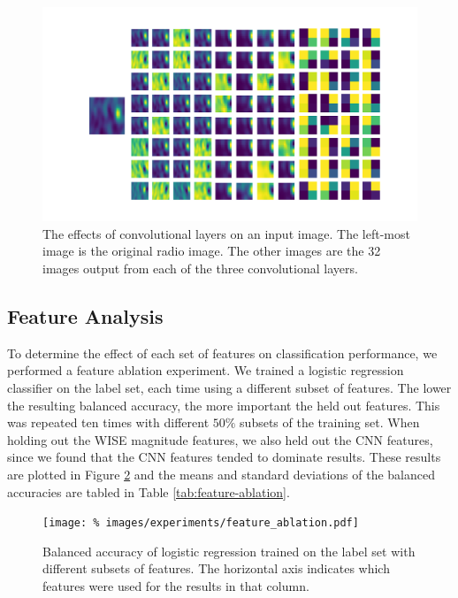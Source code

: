       \begin{figure}[!ht]
        \centering
        \includegraphics[width=\textwidth]{images/rgz_cnn}
        \caption{The effects of convolutional layers on an input image. The
          left-most image is the original radio image. The other images are the
          32 images output from each of the three convolutional layers.}
        \label{fig:rgz-cnn}
      \end{figure}

  \subsection{Feature Analysis}
  \label{sec:feature-analysis}

    To determine the effect of each set of features on classification
    performance, we performed a feature ablation experiment. We trained a
    logistic regression classifier on the \citeauthor{norris06} label set, each
    time using a different subset of features. The lower the resulting balanced
    accuracy, the more important the held out features. This was repeated ten
    times with different $50\%$ subsets of the training set. When holding out
    the WISE magnitude features, we also held out the CNN features, since we
    found that the CNN features tended to dominate results. These results are
    plotted in Figure \ref{fig:feature-ablation} and the means and standard
    deviations of the balanced accuracies are tabled in Table
    \ref{tab:feature-ablation}.

    \begin{figure}[!ht]
      \centering
      \texttt{[image: \%
        images/experiments/feature\_ablation.pdf]}
      \caption{Balanced accuracy of logistic regression trained on the
        \citeauthor{norris06} label set with different subsets of features. The
        horizontal axis indicates which features were used for the results in
        that column.}
      \label{fig:feature-ablation}
    \end{figure}

